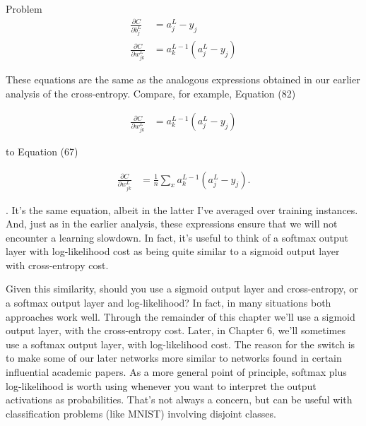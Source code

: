 \begin{exerciseBox}{Problem}
\begin{align}
\frac{\partial C}{\partial b^L_j} &= a^L_j-y_j \tag{81} \\ \frac{\partial C}{\partial w^L_{jk}} &= a^{L-1}_k (a^L_j-y_j) \tag{82}
\end{align}

\noindent These equations are the same as the analogous expressions obtained in our earlier analysis of the cross-entropy. Compare, for example, Equation (82)

\begin{align*}
\frac{\partial C}{\partial w^L_{jk}} &= a^{L-1}_k (a^L_j-y_j) \nonumber
\end{align*}

\noindent to Equation (67)

\begin{align*}
\frac{\partial C}{\partial w^L_{jk}} &= \frac{1}{n} \sum_x a^{L-1}_k (a^L_j-y_j). \nonumber
\end{align*}

\noindent. It's the same equation, albeit in the latter I've averaged over training instances. And, just as in the earlier analysis, these expressions ensure that we will not encounter a learning slowdown. In fact, it's useful to think of a softmax output layer with log-likelihood cost as being quite similar to a sigmoid output layer with cross-entropy cost.


Given this similarity, should you use a sigmoid output layer and cross-entropy, or a softmax output layer and log-likelihood? In fact, in many situations both approaches work well. Through the remainder of this chapter we'll use a sigmoid output layer, with the cross-entropy cost. Later, in Chapter 6, we'll sometimes use a softmax output layer, with log-likelihood cost. The reason for the switch is to make some of our later networks more similar to networks found in certain influential academic papers. As a more general point of principle, softmax plus log-likelihood is worth using whenever you want to interpret the output activations as probabilities. That's not always a concern, but can be useful with classification problems (like MNIST) involving disjoint classes.

\end{exerciseBox}




